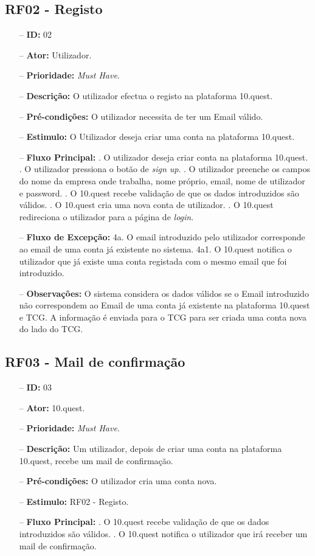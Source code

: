 \subsection{RF02 - Registo}
\begin{itemize}
	\item[--] \textbf{ID:} 02
	\item[--]  \textbf{Ator:} Utilizador.
	\item[--]  \textbf{Prioridade:} \textit{Must Have}.
	\item[--]  \textbf{Descrição:} O utilizador efectua o registo na plataforma 10.quest.
	\item[--]  \textbf{Pré-condições:} O utilizador necessita de ter um Email válido.
	\item[--]  \textbf{Estimulo:} O Utilizador deseja criar uma conta na plataforma 10.quest.
	\item[--]  \textbf{Fluxo Principal:} 
		. O utilizador deseja criar conta na plataforma 10.quest.
		. O utilizador pressiona o botão de \textit{sign up}.
		. O utilizador preenche os campos do nome da empresa onde trabalha, nome próprio, email, nome de utilizador e password.
		. O 10.quest recebe validação de que os dados introduzidos são válidos.
		. O 10.quest cria uma nova conta de utilizador.
		. O 10.quest redireciona o utilizador para a página de \textit{login}.
	\item[--]  \textbf{Fluxo de Excepção:} 
			\subitem 4a. O email introduzido pelo utilizador corresponde ao email de uma conta já existente no sistema.
			\subitem 4a1. O 10.quest notifica o utilizador que já existe uma conta registada com o mesmo email que foi introduzido.
	\item[--]  \textbf{Observações:} 
		\subitem O sistema considera os dados válidos se o Email introduzido não correspondem ao Email de uma conta já existente na plataforma 10.quest e TCG.
		\subitem A informação é enviada para o TCG para ser criada uma conta nova do lado do TCG.
\end{itemize}
\newpage

\subsection{RF03 - Mail de confirmação}
\begin{itemize}
	\item[--] \textbf{ID:} 03
	\item[--]  \textbf{Ator:} 10.quest.
	\item[--]  \textbf{Prioridade:} \textit{Must Have}.
	\item[--]  \textbf{Descrição:} Um utilizador, depois de criar uma conta na plataforma 10.quest, recebe um mail de confirmação.
	\item[--]  \textbf{Pré-condições:} O utilizador cria uma conta nova.
	\item[--]  \textbf{Estimulo:} RF02 - Registo.
	\item[--]  \textbf{Fluxo Principal:} 
			. O 10.quest recebe validação de que os dados introduzidos são válidos.
			. O 10.quest notifica o utilizador que irá receber um mail de confirmação.
\end{itemize}
\newpage

